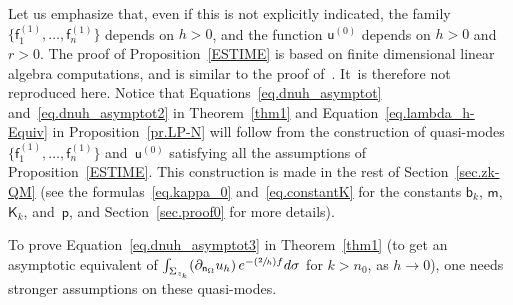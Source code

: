 \documentclass[JEP,XML,SOM,Unicode,NoEqCountersInSection,NoFloatCountersInSection,published]{cedram}
\newcommand{\Psfrac}[2]{(\sfrac{#1}{#2})}
\theoremstyle{plain}
\theoremstyle{definition}
\begin{document}
Let us emphasize that, even if this is not explicitly indicated, the
family $\{\mathsf f_1^{(1)}, \ldots,
\mathsf f_n^{(1)}\} $ depends on $h>0$, and the function $\mathsf u^{(0)}$ depends on $h>0$ and
$r>0$. The proof of Proposition~\ref{ESTIME} is based on finite dimensional
linear algebra computations, and is similar to the proof
of~\cite[Th.\,5]{DLLN-saddle1}. It~is
therefore not reproduced here. Notice that
Equations~\eqref{eq.dnuh_asymptot} and~\eqref{eq.dnuh_asymptot2} in
Theorem~\ref{thm1} and Equation~\eqref{eq.lambda_h-Equiv} in
Proposition~\ref{pr.LP-N} will follow from the construction of
quasi-modes $\{\mathsf f_1^{(1)}, \ldots, \mathsf f_n^{(1)}\} $ and~$\mathsf u^{(0)}$ satisfying all the assumptions of
Proposition~\ref{ESTIME}. This construction is made in the rest of Section~\ref{sec.zk-QM} (see
the formulas~\eqref{eq.kappa_0} and~\eqref{eq.constantK} for the
constants $\mathsf b_k$, $\mathsf m$, $\mathsf K_k$, and~$\mathsf
p$, and Section~\ref{sec.proof0} for more details).

To prove Equation~\eqref{eq.dnuh_asymptot3} in Theorem~\ref{thm1} (\ie to get an asymptotic equivalent of $\int_{\Sigma_{z_k}} (\partial_{\mathsf n_\Omega} u_h)\, e^{-\Psfrac{2}{h}f} d\sigma$ for $k>n_0$, as $h\to 0$), one needs stronger assumptions on these quasi-modes.
\end{document}
